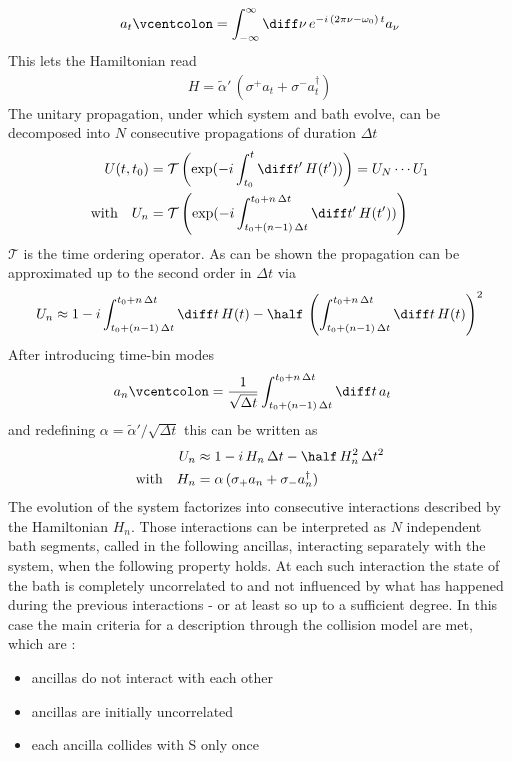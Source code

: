 \begin{align*}
    a_t\vcentcolon=\int_{-\infty}^{\infty}\diff\nu\,e^{-i\,(2\pi\nu-\omega_0)\, t}a_\nu
\end{align*}
This lets the Hamiltonian read
\begin{align*}
    H= \tilde{\alpha}'\,(\sigma^+a_t+\sigma^-a^\dagger_t)
\end{align*}
The unitary propagation, under which system and bath evolve, can be decomposed into $N$ consecutive propagations of duration $\Delta t$
\begin{align*}
    U(t,t_0)&=\mathcal{T}\left(  \exp(-i\int_{t_0}^t\diff t'\,H(t'))  \right)=U_{N}\cdots U_1\\
    \text{with}\quad U_n&=\mathcal{T}\left( \exp(-i\int_{t_0+(n-1)\,\Delta t}^{t_0+n\,\Delta t}\diff t'\,H(t'))  \right)
\end{align*}
$\mathcal{T}$ is the time ordering operator.
As can be shown \cite{ciccarello_quantum_2022} the propagation can be approximated up to the second order in $\Delta t$ via
\begin{align*}
    U_n \approx 1-i\int_{t_0+(n-1)\,\Delta t}^{t_0+n\,\Delta t}\diff t \,H(t) - \half\,\left(\int_{t_0+(n-1)\,\Delta t}^{t_0+n\,\Delta t}\diff t \,H(t)\right)^2
\end{align*}
After introducing time-bin modes
\begin{align*}
    a_n\vcentcolon&=\frac{1}{\sqrt{\Delta t}}\int_{t_0+(n-1)\,\Delta t}^{t_0+n\,\Delta t}\diff t\,a_t
\end{align*}
and redefining $\alpha=\tilde{\alpha}'/\sqrt{\Delta t}$ this can be written as
\begin{align}
    U_n &\approx 1-i\,H_n \,\Delta t-\half\,H_n^2\,\Delta t^2\notag\\
    \text{with}\quad H_n&=\alpha\,(\sigma_+a_n+\sigma_-a^\dagger_n)
\end{align}
The evolution of the system factorizes into consecutive interactions described by the Hamiltonian $H_n$. Those interactions can be interpreted as $N$ independent bath segments, called in the following ancillas, interacting separately with the system, when the following property holds. At each such interaction the state of the bath is completely uncorrelated  to and not influenced by what has happened during the previous interactions - or at least so up to a sufficient degree. In this case the main criteria for a description through the collision model are met, which are \cite{ciccarello_quantum_2022}: 
\begin{itemize}
    \item ancillas do not interact with each other 
    \item ancillas are initially uncorrelated 
    \item each ancilla collides with S only once 
\end{itemize}
